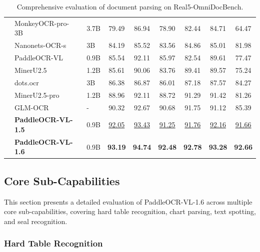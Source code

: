 \documentclass[11pt, a4paper,logo,  copyright, nonumbering]{paddleocr}
\begin{document}
\begin{table}[H]
{\begin{tabular}{l|ll|c|c c c c c}
         & MonkeyOCR-pro-3B~\cite{li2025monkeyocr} & 3.7B & 79.49 & 86.94 & 78.90 & 82.44 & 84.71 & 64.47\\
         & Nanonets-OCR-s~\cite{Nanonets-OCR-S} & 3B & 84.19 & 85.52 & 83.56 & 84.86 & 85.01 & 81.98\\
         & PaddleOCR-VL~\cite{cui2025paddleocrvl} & 0.9B & 85.54 & 92.11 & 85.97 & 82.54 & 89.61 & 77.47\\
         & MinerU2.5~\cite{niu2025mineru2} & 1.2B & 85.61 & 90.06 & 83.76 & 89.41 & 89.57 & 75.24\\
         & dots.ocr~\cite{dotsocr} & 3B & 86.38 & 86.87 & 86.01 & 87.18 & 87.57 & 84.27\\
         & MinerU2.5-pro~\cite{MinerU25Pro} & 1.2B & 88.96 & 92.11 & 88.72 & 91.29 & 91.42 & 81.26\\
         & GLM-OCR~\cite{duan2026glmocrtechnicalreport} & - & 90.32 & 92.67 & 90.68 & 91.75 & 91.12 & 85.39\\
         & \textbf{PaddleOCR-VL-1.5}~\cite{cui2026paddleocrvl15multitask09bvlm} & 0.9B & \cellcolor{cyan!15}\underline{92.05} & \cellcolor{cyan!15}\underline{93.43} & \cellcolor{cyan!15}\underline{91.25} & \cellcolor{cyan!15}\underline{91.76} & \cellcolor{cyan!15}\underline{92.16} & \cellcolor{cyan!15}\underline{91.66}\\
         & \textbf{PaddleOCR-VL-1.6} & 0.9B & \cellcolor{red!15}\textbf{93.19} & \cellcolor{red!15}\textbf{94.74} & \cellcolor{red!15}\textbf{92.48} & \cellcolor{red!15}\textbf{92.78} & \cellcolor{red!15}\textbf{93.28} & \cellcolor{red!15}\textbf{92.66}\\
        \bottomrule
    \end{tabular}%
    }
    \caption{Comprehensive evaluation of document parsing on Real5-OmniDocBench.}
    \label{tab:real5-omnidocbench-performance}
\end{table}


\subsection{Core Sub-Capabilities}

This section presents a detailed evaluation of PaddleOCR-VL-1.6 across multiple core sub-capabilities, covering hard table recognition, chart parsing, text spotting, and seal recognition.

\subsubsection{Hard Table Recognition}
\end{document}
